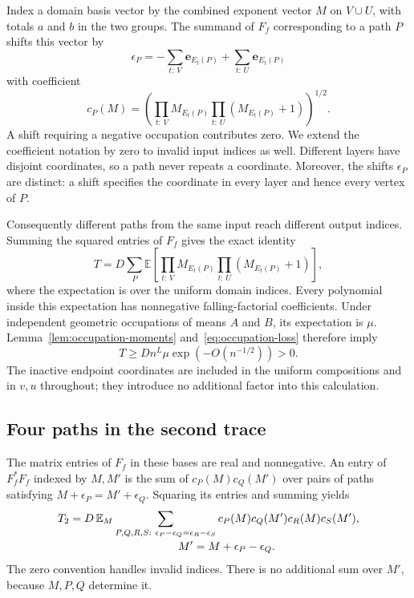 Index a domain basis vector by the combined exponent vector $M$ on
$V\cup U$, with totals $a$ and $b$ in the two groups.  The summand of
$F_f$ corresponding to a path $P$ shifts this vector by
\[
  \epsilon_P
  =-\sum_{t:\,V}\mathbf e_{E_t(P)}
    +\sum_{t:\,U}\mathbf e_{E_t(P)}
\]
with coefficient
\begin{equation}
  c_P(M)
    =\left(
       \prod_{t:\,V}M_{E_t(P)}
       \prod_{t:\,U}(M_{E_t(P)}+1)
      \right)^{1/2}.
  \label{eq:path-coefficient}
\end{equation}
A shift requiring a negative occupation contributes zero.  We extend
the coefficient notation by zero to invalid input indices as well.
Different layers have disjoint coordinates, so a path never repeats a
coordinate.  Moreover, the shifts $\epsilon_P$ are distinct: a shift
specifies the coordinate in every layer and hence every vertex of $P$.

Consequently different paths from the same input reach different
output indices.  Summing the squared entries of $F_f$ gives the exact
identity
\[
  T=D\sum_P\mathbb E\left[
       \prod_{t:\,V}M_{E_t(P)}
       \prod_{t:\,U}(M_{E_t(P)}+1)
      \right],
\]
where the expectation is over the uniform domain indices.  Every
polynomial inside this expectation has nonnegative falling-factorial
coefficients.  Under independent geometric occupations of means $A$
and $B$, its expectation is $\mu$.  Lemma~\ref{lem:occupation-moments}
and~\eqref{eq:occupation-loss} therefore imply
\begin{equation}
  T\ge Dn^L\mu\exp(-O(n^{-1/2}))>0.
  \label{eq:first-trace}
\end{equation}
The inactive endpoint coordinates are included in the uniform
compositions and in $v,u$ throughout; they introduce no additional
factor into this calculation.

\subsection{Four paths in the second trace}

The matrix entries of $F_f$ in these bases are real and nonnegative.
An entry of $F_f^*F_f$ indexed by $M,M'$ is the sum of
$c_P(M)c_Q(M')$ over pairs of paths satisfying
$M+\epsilon_P=M'+\epsilon_Q$.  Squaring its entries and summing yields
\begin{equation}
\begin{split}
  T_2
   &=D\,\mathbb E_M
      \sum_{\substack{P,Q,R,S:\
        \epsilon_P-\epsilon_Q=\epsilon_R-\epsilon_S}}
        c_P(M)c_Q(M')c_R(M)c_S(M'),\\[-2pt]
  &\hspace{34mm} M'=M+\epsilon_P-\epsilon_Q.
\end{split}
  \label{eq:four-path-trace}
\end{equation}
The zero convention handles invalid indices.  There is no additional
sum over $M'$, because $M,P,Q$ determine it.

